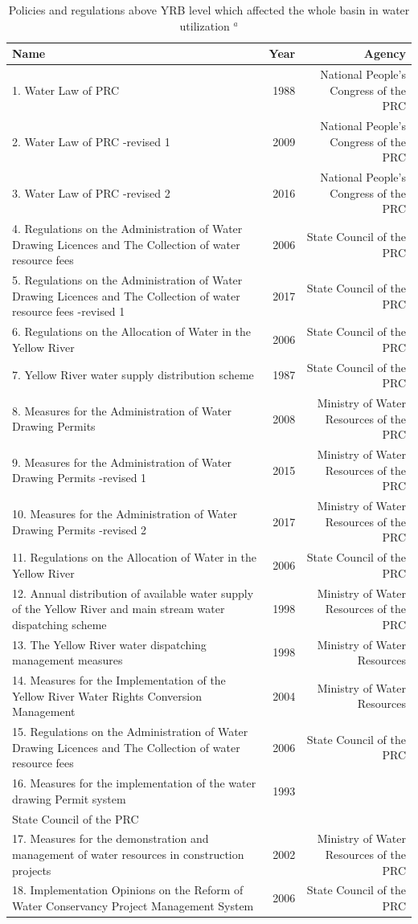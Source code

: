 \documentclass[9pt,twoside,lineno]{pnas-new}
\begin{document}
\begin{table}\centering
    \caption{Policies and regulations above YRB level which affected the whole basin in water utilization $^a$}

    \begin{tabular}{lrr}
    Name & Year & Agency \\
    \midrule
    1. Water Law of PRC & 1988 & National People's Congress of the PRC \\
    2. Water Law of PRC -revised 1 & 2009 & National People's Congress of the PRC \\
    3. Water Law of PRC -revised 2 & 2016 & National People's Congress of the PRC \\
    4. Regulations on the Administration of Water Drawing Licences and The Collection of water resource fees & 2006 & State Council of the PRC \\
    5. Regulations on the Administration of Water Drawing Licences and The Collection of water resource fees -revised 1 & 2017 & State Council of the PRC \\
    6. Regulations on the Allocation of Water in the Yellow River & 2006 & State Council of the PRC \\
    7. Yellow River water supply distribution scheme & 1987 & State Council of the PRC \\
    8. Measures for the Administration of Water Drawing Permits & 2008 & Ministry of Water Resources of the PRC \\
    9. Measures for the Administration of Water Drawing Permits -revised 1 & 2015 & Ministry of Water Resources of the PRC \\
    10. Measures for the Administration of Water Drawing Permits -revised 2 & 2017 & Ministry of Water Resources of the PRC \\
    11. Regulations on the Allocation of Water in the Yellow River & 2006 & State Council of the PRC \\
    12. Annual distribution of available water supply of the Yellow River and main stream water dispatching scheme & 1998 & Ministry of Water Resources of the PRC \\
    13. The Yellow River water dispatching management measures & 1998 & Ministry of Water Resources \\
    14. Measures for the Implementation of the Yellow River Water Rights Conversion Management & 2004 & Ministry of Water Resources \\
    15. Regulations on the Administration of Water Drawing Licences and The Collection of water resource fees & 2006 & State Council of the PRC \\
    16. Measures for the implementation of the water drawing Permit system & 1993 \\ State Council of the PRC \\
    17. Measures for the demonstration and management of water resources in construction projects & 2002 & Ministry of Water Resources of the PRC \\
    18. Implementation Opinions on the Reform of Water Conservancy Project Management System & 2006 & State Council of the PRC \\


\end{tabular}
\end{table}
\end{document}
